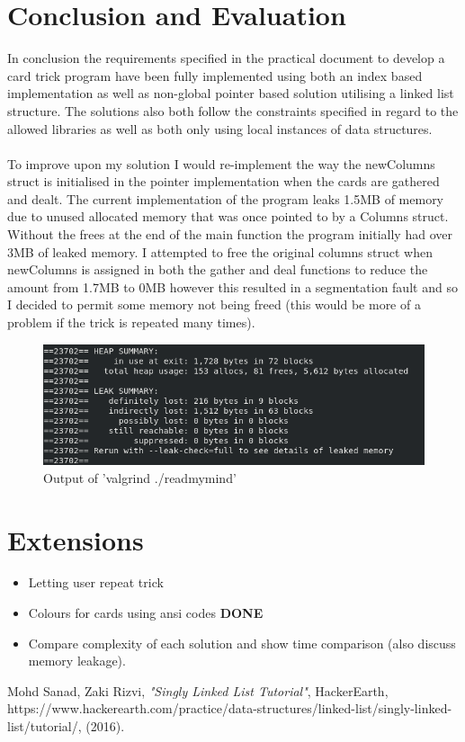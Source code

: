 \documentclass[11]{article}
\begin{document}
	\section{Conclusion and Evaluation}
	In conclusion the requirements specified in the practical document to develop a card trick program have been fully implemented using both an index based implementation as well as non-global pointer based solution utilising a linked list structure. The solutions also both follow the constraints specified in regard to the allowed libraries as well as both only using local instances of data structures. \\\\ To improve upon my solution I would re-implement the way the newColumns struct is initialised in the pointer implementation when the cards are gathered and dealt. The current implementation of the program leaks 1.5MB of memory due to unused allocated memory that was once pointed to by a Columns struct. Without the frees at the end of the main function the program initially had over 3MB of leaked memory. I attempted to free the original columns struct when newColumns is assigned in both the gather and deal functions to reduce the amount from 1.7MB to 0MB however this resulted in a segmentation fault and so I decided to permit some memory not being freed (this would be more of a problem if the trick is repeated many times).
	
				\begin{figure}[h!]
					\caption{Output of 'valgrind ./readmymind'}				\centering
					\includegraphics[scale=0.5]{ValGrind.png}
				\end{figure}
	
	
	\section{Extensions}
		\begin{itemize}
			\item Letting user repeat trick
			\item Colours for cards using ansi codes \textbf{DONE}
			\item Compare complexity of each solution and show time comparison (also discuss memory leakage).
		\end{itemize}
		
	\begin{thebibliography}{1}
  		 Mohd Sanad, Zaki Rizvi, \textit{"Singly Linked List Tutorial"}, HackerEarth, https://www.hackerearth.com/practice/data-structures/linked-list/singly-linked-list/tutorial/, (2016).
  	\end{thebibliography}
		
\end{document}
